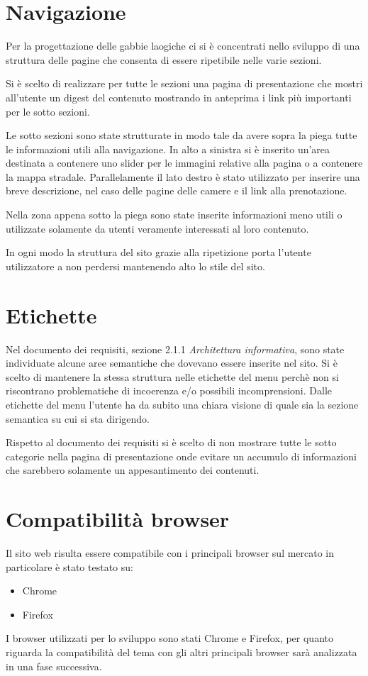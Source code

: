 \documentclass[a4paper,12pt,hidelinks]{report}
\begin{document}
\newpage
\section*{Navigazione}
Per la progettazione delle gabbie laogiche ci si è concentrati nello sviluppo di una struttura delle pagine che consenta di essere ripetibile nelle varie sezioni.
\par Si è scelto di realizzare per tutte le sezioni una pagina di presentazione che mostri all'utente un digest del contenuto mostrando in anteprima i link 
più importanti per le sotto sezioni.
\par Le sotto sezioni sono state strutturate in modo tale da avere sopra la piega tutte le informazioni utili alla navigazione. In alto a sinistra si è inserito un'area 
destinata a contenere uno slider per le immagini relative alla pagina o a contenere la mappa stradale. Parallelamente il lato destro è stato utilizzato 
per inserire una breve descrizione, nel caso delle pagine delle camere e il link alla prenotazione.
 \par Nella zona appena sotto la piega sono state inserite informazioni meno utili o utilizzate solamente da utenti veramente interessati al loro contenuto.
 \par In ogni modo la struttura del sito grazie alla ripetizione porta l'utente utilizzatore a non perdersi mantenendo alto lo stile del sito.

\section*{Etichette}
Nel documento dei requisiti, sezione 2.1.1 \textit{Architettura informativa}, sono state individuate alcune aree semantiche che dovevano essere inserite nel sito.
Si è scelto di mantenere la stessa struttura nelle etichette del menu perchè non si riscontrano problematiche di incoerenza e/o possibili incomprensioni. 
Dalle etichette del menu l'utente ha da subito una chiara visione di quale sia la sezione semantica su cui si sta dirigendo. 
\par Rispetto al documento dei requisiti si è scelto di non mostrare tutte le sotto categorie nella pagina di presentazione onde evitare 
un accumulo di informazioni che sarebbero solamente un appesantimento dei contenuti.

\section*{Compatibilità browser}
Il sito web risulta essere compatibile con i principali browser sul mercato in particolare è stato testato su:
\begin{itemize}
 \item Chrome
 \item Firefox
\end{itemize}
I browser utilizzati per lo sviluppo sono stati Chrome e Firefox, per quanto riguarda la compatibilità del tema con gli altri principali browser sarà analizzata in una fase successiva.
\end{document}
